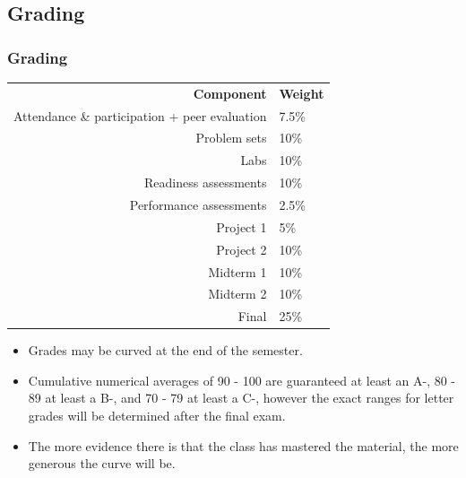 \documentclass[slidestop,compress,mathserif,12pt,t,professionalfonts,xcolor=table]{beamer}
\begin{document}

\subsection{Grading}


\begin{frame}
\frametitle{Grading}

\begin{center}
\renewcommand\arraystretch{1.25}
{\scriptsize
\begin{tabular}{ r | l }
\textbf{Component} & \textbf{Weight} \\
Attendance \& participation + peer evaluation	& 7.5\% \\
Problem sets							& 10\%  \\ 
Labs									& 10\% \\    
Readiness assessments					& 10\%   \\  
Performance assessments 				& 2.5\%  \\  
Project 1								& 5\%   \\   
Project 2								& 10\% \\   
Midterm 1								& 10\% \\    
Midterm 2 							& 10\% \\    
Final 								& 25\%     
\end{tabular}
}
\end{center}

\begin{itemize}

\item Grades may be curved at the end of the semester. 

\item Cumulative numerical averages of 90 - 100 are guaranteed at least an A-, 
80 - 89 at least a B-, and 70 - 79 at least a C-, however the exact ranges for letter 
grades will be determined after the final exam.

\item The more evidence there is that the class has mastered the material, the more 
generous the curve will be.

\end{itemize}



\end{frame}

\end{document}
